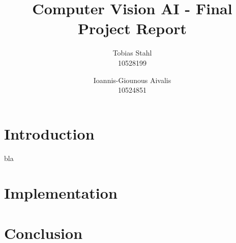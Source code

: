 \documentclass[11pt]{article}
\title{
	\textbf{Computer Vision AI - Final Project Report}
}
\author{Tobias Stahl \\ 10528199 \and Ioannis-Giounous Aivalis \\ 10524851}
\begin{document}
\maketitle

\section{Introduction}

bla \cite{Sochman07learninga}

\section{Implementation}


\section{Conclusion}


\end{document}
